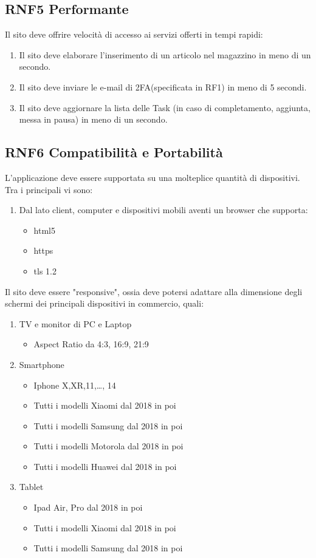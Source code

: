 \documentclass{report}
\begin{document}
\subsection*{RNF5 Performante}
Il sito deve offrire velocità di accesso ai servizi offerti in tempi rapidi:
\begin{enumerate}
	\item Il sito deve elaborare l'inserimento di un articolo nel magazzino in meno di un secondo.
	\item Il sito deve inviare le e-mail di 2FA(specificata in RF1) in meno di 5 secondi.
	\item Il sito deve aggiornare la lista delle Task (in caso di completamento, aggiunta, messa in pausa) in meno di un secondo.
\end{enumerate}

\subsection*{RNF6 Compatibilità e Portabilità}
L'applicazione deve essere supportata su una molteplice quantità di dispositivi.
Tra i principali vi sono:
\begin{enumerate}
	\item Dal lato client, computer e dispositivi mobili aventi un browser che supporta:
    \begin{itemize}
		\item html5
		\item https
		\item tls 1.2
	\end{itemize}
\end{enumerate}
Il sito deve essere "responsive", ossia deve potersi adattare alla dimensione degli schermi dei principali dispositivi in commercio, quali:
\begin{enumerate}
	\item TV e monitor di PC e Laptop 
	\begin{itemize}
		\item Aspect Ratio da 4:3, 16:9, 21:9
	\end{itemize}
	\item Smartphone
	\begin{itemize}
		\item Iphone X,XR,11,\dots , 14
		\item Tutti i modelli Xiaomi dal 2018 in poi 
		\item Tutti i modelli Samsung dal 2018 in poi
		\item Tutti i modelli Motorola dal 2018 in poi 
		\item Tutti i modelli Huawei dal 2018 in poi 
	\end{itemize}
	\item Tablet 
	\begin{itemize}
		\item Ipad Air, Pro dal 2018 in poi
		\item Tutti i modelli Xiaomi dal 2018 in poi
		\item Tutti i modelli Samsung dal 2018 in poi
	\end{itemize}
\end{enumerate}
\end{document}
